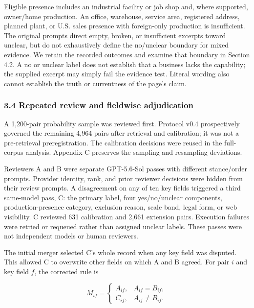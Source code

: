 \documentclass[10pt]{article}
\begin{document}
Eligible presence includes an industrial facility or job shop and, where supported, owner/home production. An office, warehouse, service area, registered address, planned plant, or U.S. sales presence with foreign-only production is insufficient. The original prompts direct empty, broken, or insufficient excerpts toward unclear, but do not exhaustively define the no/unclear boundary for mixed evidence. We retain the recorded outcomes and examine that boundary in Section 4.2. A no or unclear label does not establish that a business lacks the capability; the supplied excerpt may simply fail the evidence test. Literal wording also cannot establish the truth or currentness of the page's claim.

\hypertarget{repeated-review-and-fieldwise-adjudication}{%
\subsubsection{3.4 Repeated review and fieldwise adjudication}\label{repeated-review-and-fieldwise-adjudication}}

A 1,200-pair probability sample was reviewed first. Protocol v0.4 prospectively governed the remaining 4,964 pairs after retrieval and calibration; it was not a pre-retrieval preregistration. The calibration decisions were reused in the full-corpus analysis. Appendix C preserves the sampling and resampling deviations.

Reviewers A and B were separate GPT-5.6-Sol passes with different stance/order prompts. Provider identity, rank, and prior reviewer decisions were hidden from their review prompts. A disagreement on any of ten key fields triggered a third same-model pass, C: the primary label, four yes/no/unclear components, production-presence category, exclusion reason, scale band, legal form, or web visibility. C reviewed 631 calibration and 2,661 extension pairs. Execution failures were retried or requeued rather than assigned unclear labels. These passes were not independent models or human reviewers.

The initial merger selected C's whole record when any key field was disputed. This allowed C to overwrite other fields on which A and B agreed. For pair \(i\) and key field \(f\), the corrected rule is

\[
M_{if} = \begin{cases} A_{if}, & A_{if}=B_{if}, \\ C_{if}, & A_{if}\ne B_{if}. \end{cases}
\]
\end{document}
